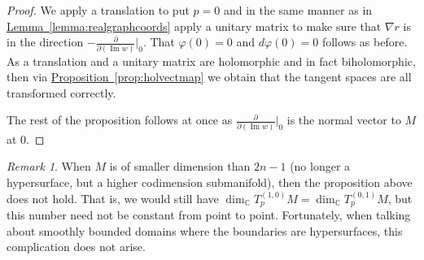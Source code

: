 \documentclass[12pt,openany]{book}
\renewcommand{\Im}{\operatorname{Im}}
\newcommand{\C}{{\mathbb{C}}}
\theoremstyle{plain}
\theoremstyle{remark}
\newtheorem{remark}[thm]{Remark}
\theoremstyle{definition}
\theoremstyle{exercise}
\theoremstyle{example}
\newcommand{\propref}[1]{\hyperref[#1]{Proposition~\ref*{#1}}}
\newcommand{\lemmaref}[1]{\hyperref[#1]{Lemma~\ref*{#1}}}
\begin{document}
\begin{proof}
We apply a translation to put $p=0$ and in the
same manner as in \lemmaref{lemma:realgraphcoords}
apply a unitary matrix to make sure that $\nabla r$ is
in the direction
$-\frac{\partial}{\partial (\Im w)}\big|_0$.  That $\varphi(0) = 0$
and $d\varphi(0) = 0$ follows as before.
As a translation and a unitary matrix are holomorphic
and in fact biholomorphic, then
via \propref{prop:holvectmap} we obtain that the tangent spaces are all
transformed correctly.

The rest of the proposition follows at once as
$\frac{\partial}{\partial (\Im w)}\big|_0$ is the normal vector to $M$
at $0$.
\end{proof}

\begin{remark}
When $M$ is of smaller dimension than $2n-1$ (no longer a hypersurface, but
a higher codimension submanifold), then the proposition above does not hold.
That is, we would still have $\dim_\C T_p^{(1,0)} M = \dim_\C T_p^{(0,1)}
M$, but this number need not be constant from point to point.  Fortunately,
when talking about smoothly bounded domains where the boundaries are
hypersurfaces, this complication does not arise.
\end{remark}
\end{document}
